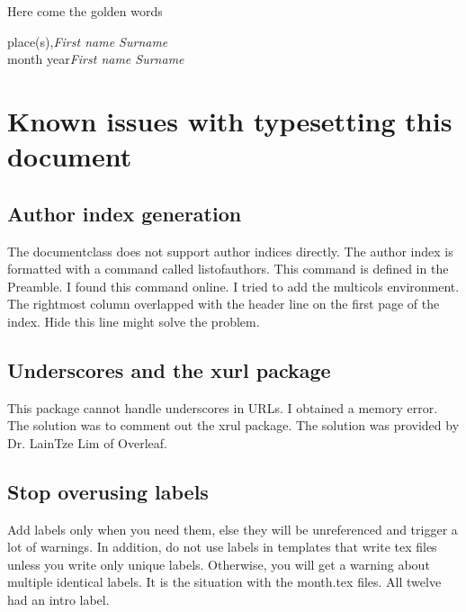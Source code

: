 %
%
%

\preface
{}
Here come the golden words


\vspace{1cm}
\begin{flushright}\noindent
place(s),\hfill {\it First name  Surname}\\
month year\hfill {\it First name  Surname}\\
\end{flushright}


\section*{Known issues with typesetting this document}

\subsection{Author index generation}
The documentclass does not support author indices directly.
The author index is formatted with a command called listofauthors.
This command is defined in the Preamble. 
I found this command online.
I tried to add the multicols environment.
The rightmost column overlapped with the header line on the first page of the index.
Hide this line might solve the problem.

\subsection{Underscores and the xurl package}
This package cannot handle underscores in URLs.
I obtained a memory error.
The solution was to comment out the xrul package.
The solution was provided by Dr. LainTze Lim of Overleaf.

\subsection{Stop overusing labels}
Add labels only when you need them, else they will be unreferenced and trigger a lot of warnings.
In addition, do not use labels in templates that write tex files unless you write only unique labels.
Otherwise, you will get a warning about multiple identical labels.
It is the situation with the month.tex files.
All twelve had an intro label.


